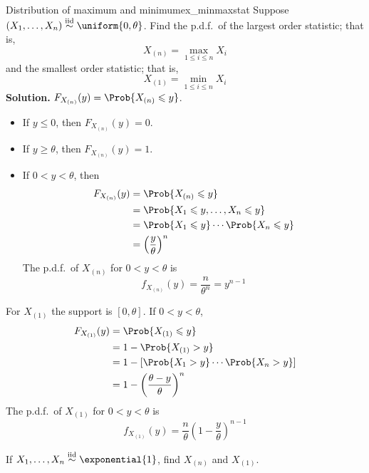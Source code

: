 \begin{Example}{Distribution of maximum and minimum}{ex_minmaxstat}
    Suppose $ (X_1,\ldots,X_n)\stackrel{\text{iid}}{\sim}\uniform{0,\theta} $.
    Find the p.d.f.\ of the largest order statistic; that is,
    \[ X_{(n)}=\max_{1\leqslant i\leqslant n} X_i \]
    and the smallest order statistic; that is,
    \[ X_{(1)}=\min_{1\leqslant i\leqslant n}X_i \]
    \textbf{Solution.} $ F_{X_{(n)}}(y)=\Prob{X_{(n)}\leqslant y} $.
    \begin{itemize}
        \item If $ y\leqslant 0 $, then $ F_{X_{(n)}}(y)=0 $.
        \item If $ y\geqslant \theta $, then $ F_{X_{(n)}}(y)=1 $.
        \item If $ 0<y<\theta $, then
              \begin{align*}
                  F_{X_{(n)}}(y)
                   & =\Prob{X_{(n)}\leqslant y}                        \\
                   & =\Prob{X_1\leqslant y,\ldots,X_n\leqslant y}      \\
                   & =\Prob{X_1\leqslant y}\cdots\Prob{X_n\leqslant y} \\
                   & =\left( \frac{y}{\theta} \right)^n
              \end{align*}
              The p.d.f.\ of $ X_{(n)} $ for $ 0<y<\theta $ is
              \[ f_{X_{(n)}}(y)=\frac{n}{\theta^n}= y^{n-1} \]
    \end{itemize}
    For $ X_{(1)} $ the support is $ [0,\theta] $. If $ 0<y<\theta $,
    \begin{align*}
        F_{X_{(1)}}(y)
         & =\Prob{X_{(1)}\leqslant y}                        \\
         & =1-\Prob{X_{(1)}>y}                               \\
         & =1-\left[ \Prob{X_1>y}\cdots \Prob{X_n>y} \right] \\
         & =1-\left( \frac{\theta-y}{\theta}  \right)^n
    \end{align*}
    The p.d.f.\ of $ X_{(1)} $ for $ 0<y<\theta $ is
    \[ f_{X_{(1)}}(y)=\frac{n}{\theta} \left( 1-\frac{y}{\theta}  \right)^{n-1} \]
\end{Example}
\begin{Exercise}{}{}
    If $ X_1,\ldots,X_n \stackrel{\text{iid}}{\sim} \exponential{1} $,
    find $ X_{(n)} $ and $ X_{(1)} $.
\end{Exercise}
